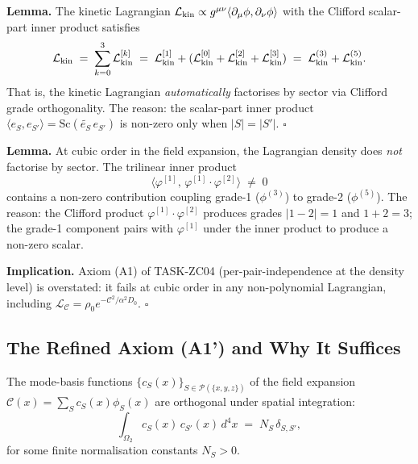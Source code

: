 \documentclass[12pt, a4paper]{article}
\begin{document}
\begin{formalbox}[title={LEM-AA01: Kinetic-Order Grade Orthogonality
  (A1 holds at quadratic order)}]
\textbf{Lemma.} The kinetic Lagrangian
$\mathcal{L}_{\rm kin} \propto g^{\mu\nu} \langle \partial_\mu \phi,
\partial_\nu \phi \rangle$ with the Clifford scalar-part inner
product satisfies
\begin{equation}
  \mathcal{L}_{\rm kin}
  \;=\;
  \sum_{k=0}^{3} \mathcal{L}_{\rm kin}^{[k]}
  \;=\;
  \mathcal{L}_{\rm kin}^{[1]} + (\mathcal{L}_{\rm kin}^{[0]} + \mathcal{L}_{\rm kin}^{[2]} + \mathcal{L}_{\rm kin}^{[3]})
  \;=\;
  \mathcal{L}_{\rm kin}^{(3)} + \mathcal{L}_{\rm kin}^{(5)}.
\end{equation}
That is, the kinetic Lagrangian \emph{automatically} factorises by
sector via Clifford grade orthogonality. The reason: the scalar-part
inner product
$\langle e_S, e_{S'} \rangle = \mathrm{Sc}(\widetilde{e_S}\, e_{S'})$
is non-zero only when $|S| = |S'|$. \hfill$\square$
\end{formalbox}

\begin{formalbox}[title={LEM-AA02: Cubic-Order Density Mixing
  (where (A1) breaks)}]
\textbf{Lemma.} At cubic order in the field expansion, the
Lagrangian density does \emph{not} factorise by sector. The
trilinear inner product
\begin{equation}
  \langle \varphi^{[1]},\, \varphi^{[1]} \cdot \varphi^{[2]} \rangle
  \;\ne\; 0
\end{equation}
contains a non-zero contribution coupling grade-1 ($\phi^{(3)}$) to
grade-2 ($\phi^{(5)}$). The reason: the Clifford product
$\varphi^{[1]} \cdot \varphi^{[2]}$ produces grades $|1-2| = 1$ and
$1+2 = 3$; the grade-1 component pairs with $\varphi^{[1]}$ under
the inner product to produce a non-zero scalar.

\textbf{Implication.} Axiom (A1) of TASK-ZC04 (per-pair-independence
at the density level) is overstated: it fails at cubic order in any
non-polynomial Lagrangian, including
$\mathcal{L}_\mathcal{C} = \rho_0 e^{-\mathcal{C}^2/\alpha^2 D_0}$.
\hfill$\square$
\end{formalbox}

\subsection{The Refined Axiom (A1') and Why It Suffices}

\begin{formalbox}[title={Axiom (A1'): Mode Basis Orthogonality at
  Action-Integral Level}]
The mode-basis functions $\{c_S(x)\}_{S \in \mathcal{P}(\{x,y,z\})}$
of the field expansion $\mathcal{C}(x) = \sum_S c_S(x) \phi_S(x)$
are orthogonal under spatial integration:
\begin{equation}
  \int_{\Omega_2} c_S(x)\, c_{S'}(x)\, d^4 x
  \;=\;
  N_S\, \delta_{S, S'},
  \label{eq:A1-prime}
\end{equation}
for some finite normalisation constants $N_S > 0$.
\end{formalbox}
\end{document}
